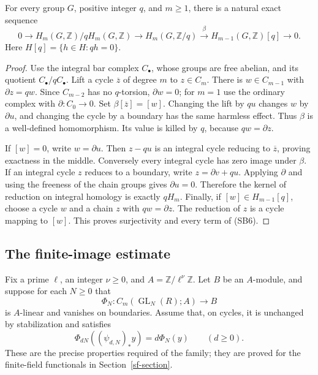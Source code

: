 \begin{lemma}\label{sb-coefficients}
For every group \(G\), positive integer \(q\), and
\(m\ge1\), there is a natural exact sequence
\[
 0\longrightarrow H_m(G,\mathbb Z)/qH_m(G,\mathbb Z)
 \longrightarrow H_m(G,\mathbb Z/q)
 \xrightarrow{\ \beta\ }H_{m-1}(G,\mathbb Z)[q]
 \longrightarrow0.
 \tag{SB6}
\]
Here \(H[q]=\{h\in H:qh=0\}\).
\end{lemma}
\begin{proof}
Use the integral bar complex \(C_\bullet\), whose groups
are free abelian, and its quotient \(C_\bullet/qC_\bullet\).
Lift a cycle \(\overline z\) of degree \(m\) to
\(z\in C_m\).  There is \(w\in C_{m-1}\) with
\(\partial z=qw\).  Since \(C_{m-2}\) has no
\(q\)-torsion, \(\partial w=0\); for \(m=1\)
use the ordinary complex with \(\partial:C_0\to0\).
Set \(\beta[\overline z]=[w]\).
Changing the lift by \(qu\) changes \(w\) by
\(\partial u\), and changing the cycle by a boundary
has the same harmless effect.  Thus \(\beta\) is a
well-defined homomorphism.  Its value is killed by
\(q\), because \(qw=\partial z\).

If \([w]=0\), write \(w=\partial u\).  Then
\(z-qu\) is an integral cycle reducing to
\(\overline z\), proving exactness in the middle.
Conversely every integral cycle has zero image under
\(\beta\).  If an integral cycle \(z\) reduces to a
boundary, write \(z=\partial v+qu\).  Applying
\(\partial\) and using the freeness of the chain groups
gives \(\partial u=0\).  Therefore the kernel of
reduction on integral homology is exactly \(qH_m\).
Finally, if \([w]\in H_{m-1}[q]\), choose a cycle
\(w\) and a chain \(z\) with \(qw=\partial z\).
The reduction of \(z\) is a cycle mapping to \([w]\).
This proves surjectivity and every term of (SB6).
\end{proof}

\subsection{The finite-image estimate}

Fix a prime \(\ell\), an integer \(\nu\ge0\), and
\(A=\mathbb Z/\ell^\nu\mathbb Z\).  Let \(B\) be
an \(A\)-module, and suppose for each \(N\ge0\) that
\[
 \Phi_N:C_m(\operatorname{GL}_N(R);A)\longrightarrow B
\]
is \(A\)-linear and vanishes on boundaries.
Assume that, on cycles, it is unchanged by stabilization
and satisfies
\[
     \Phi_{dN}((\psi_{d,N})_*y)=d\Phi_N(y)
                         \qquad(d\ge0).
 \tag{SB7}
\]
These are the precise properties required of the
family; they are proved for the finite-field functionals
in Section~\ref{sf-section}.


